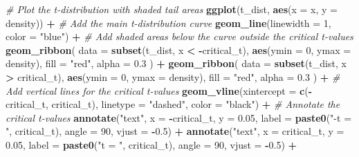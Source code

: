 \documentclass[
]{book}
\newenvironment{Shaded}{\begin{snugshade}}{\end{snugshade}}
\newcommand{\AttributeTok}[1]{\textcolor[rgb]{0.13,0.29,0.53}{#1}}
\newcommand{\CommentTok}[1]{\textcolor[rgb]{0.56,0.35,0.01}{\textit{#1}}}
\newcommand{\DecValTok}[1]{\textcolor[rgb]{0.00,0.00,0.81}{#1}}
\newcommand{\FloatTok}[1]{\textcolor[rgb]{0.00,0.00,0.81}{#1}}
\newcommand{\FunctionTok}[1]{\textcolor[rgb]{0.13,0.29,0.53}{\textbf{#1}}}
\newcommand{\NormalTok}[1]{#1}
\newcommand{\SpecialCharTok}[1]{\textcolor[rgb]{0.81,0.36,0.00}{\textbf{#1}}}
\newcommand{\StringTok}[1]{\textcolor[rgb]{0.31,0.60,0.02}{#1}}
\begin{document}
\begin{Shaded}
\begin{Highlighting}[]
\CommentTok{\# Plot the t{-}distribution with shaded tail areas}
\FunctionTok{ggplot}\NormalTok{(t\_dist, }\FunctionTok{aes}\NormalTok{(}\AttributeTok{x =}\NormalTok{ x, }\AttributeTok{y =}\NormalTok{ density)) }\SpecialCharTok{+}
  \CommentTok{\# Add the main t{-}distribution curve}
  \FunctionTok{geom\_line}\NormalTok{(}\AttributeTok{linewidth =} \DecValTok{1}\NormalTok{, }\AttributeTok{color =} \StringTok{"blue"}\NormalTok{) }\SpecialCharTok{+}
  \CommentTok{\# Add shaded areas below the curve outside the critical t{-}values}
  \FunctionTok{geom\_ribbon}\NormalTok{(}
    \AttributeTok{data =} \FunctionTok{subset}\NormalTok{(t\_dist, x }\SpecialCharTok{\textless{}} \SpecialCharTok{{-}}\NormalTok{critical\_t),}
    \FunctionTok{aes}\NormalTok{(}\AttributeTok{ymin =} \DecValTok{0}\NormalTok{, }\AttributeTok{ymax =}\NormalTok{ density),}
    \AttributeTok{fill =} \StringTok{"red"}\NormalTok{,}
    \AttributeTok{alpha =} \FloatTok{0.3}
\NormalTok{  ) }\SpecialCharTok{+}
  \FunctionTok{geom\_ribbon}\NormalTok{(}
    \AttributeTok{data =} \FunctionTok{subset}\NormalTok{(t\_dist, x }\SpecialCharTok{\textgreater{}}\NormalTok{ critical\_t),}
    \FunctionTok{aes}\NormalTok{(}\AttributeTok{ymin =} \DecValTok{0}\NormalTok{, }\AttributeTok{ymax =}\NormalTok{ density),}
    \AttributeTok{fill =} \StringTok{"red"}\NormalTok{,}
    \AttributeTok{alpha =} \FloatTok{0.3}
\NormalTok{  ) }\SpecialCharTok{+}
  \CommentTok{\# Add vertical lines for the critical t{-}values}
  \FunctionTok{geom\_vline}\NormalTok{(}\AttributeTok{xintercept =} \FunctionTok{c}\NormalTok{(}\SpecialCharTok{{-}}\NormalTok{critical\_t, critical\_t),}
             \AttributeTok{linetype =} \StringTok{"dashed"}\NormalTok{, }\AttributeTok{color =} \StringTok{"black"}\NormalTok{) }\SpecialCharTok{+}
  \CommentTok{\# Annotate the critical t{-}values}
  \FunctionTok{annotate}\NormalTok{(}\StringTok{"text"}\NormalTok{, }\AttributeTok{x =} \SpecialCharTok{{-}}\NormalTok{critical\_t, }\AttributeTok{y =} \FloatTok{0.05}\NormalTok{,}
           \AttributeTok{label =} \FunctionTok{paste0}\NormalTok{(}\StringTok{"{-}t = "}\NormalTok{, critical\_t), }\AttributeTok{angle =} \DecValTok{90}\NormalTok{, }\AttributeTok{vjust =} \SpecialCharTok{{-}}\FloatTok{0.5}\NormalTok{) }\SpecialCharTok{+}
  \FunctionTok{annotate}\NormalTok{(}\StringTok{"text"}\NormalTok{, }\AttributeTok{x =}\NormalTok{ critical\_t, }\AttributeTok{y =} \FloatTok{0.05}\NormalTok{,}
           \AttributeTok{label =} \FunctionTok{paste0}\NormalTok{(}\StringTok{"t = "}\NormalTok{, critical\_t), }\AttributeTok{angle =} \DecValTok{90}\NormalTok{, }\AttributeTok{vjust =} \SpecialCharTok{{-}}\FloatTok{0.5}\NormalTok{) }\SpecialCharTok{+}

\end{Highlighting}
\end{Shaded}
\end{document}
